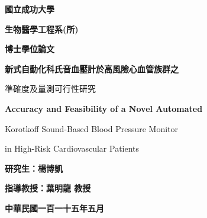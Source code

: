 \thispagestyle{empty}
\begin{center}

{\fontsize{24}{28}\selectfont\bfseries 國立成功大學\par}
\vspace{0.3cm}
{\fontsize{20}{24}\selectfont\bfseries 生物醫學工程系(所)\par}
\vspace{0.3cm}
{\fontsize{20}{24}\selectfont\bfseries 博士學位論文\par}

\vspace{2cm}

{\fontsize{18}{27}\selectfont\bfseries
新式自動化科氏音血壓計於高風險心血管族群之\par
準確度及量測可行性研究\par}

\vspace{1cm}

{\fontsize{16}{24}\selectfont\bfseries
Accuracy and Feasibility of a Novel Automated\par
Korotkoff Sound-Based Blood Pressure Monitor\par
in High-Risk Cardiovascular Patients\par}

\vfill

{\fontsize{16}{24}\selectfont\bfseries 研究生：楊博凱\par}
\vspace{0.4cm}
{\fontsize{16}{24}\selectfont\bfseries 指導教授：葉明龍 教授\par}

\vspace{1.5cm}

{\fontsize{16}{24}\selectfont\bfseries 中華民國一百一十五年五月\par}

\vspace{1cm}

\end{center}
\newpage
\frontmatter
{}
\setcounter{page}{1}
